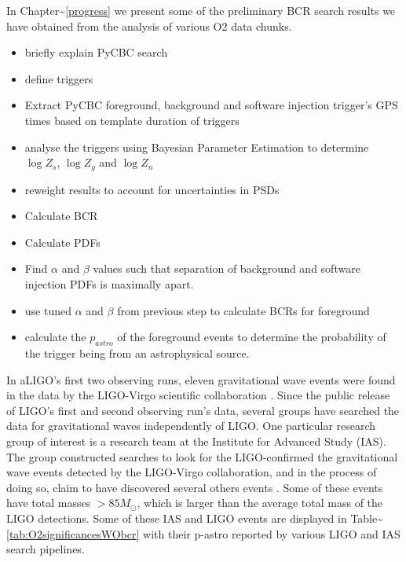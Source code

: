 \documentclass[%
 reprint,
 amsmath,amssymb,
 aps,
]{revtex4}
\begin{document}
In Chapter\textasciitilde\ref{progress} we present some of the preliminary BCR search results we
have obtained from the analysis of various O2 data chunks.






\begin{itemize}
	\item briefly explain PyCBC search
	\item define triggers
	\item Extract PyCBC foreground, background and software injection trigger's GPS times based on template duration of triggers
	\item analyse the triggers using Bayesian Parameter Estimation to determine $\log{Z_s}$, $\log{Z_g}$ and $\log{Z_n}$
	\item reweight results to account for uncertainties in PSDs
	\item Calculate BCR
	\item Calculate PDFs
	\item Find $\alpha$ and $\beta$ values such that separation of background and software injection PDFs is maximally apart.
	\item use tuned $\alpha$ and $\beta$ from previous step to calculate BCRs for foreground
	\item calculate the $p_{astro}$ of the foreground events to determine the probability of the trigger being from an astrophysical source. 
\end{itemize}




In aLIGO's first two observing runs, eleven gravitational wave events were found in the data by the LIGO-Virgo
scientific collaboration \citep{abbott2019gwtc}. Since the public release of LIGO's first and second observing run's data,
several groups have searched the data for gravitational waves independently of LIGO. One particular research group of
interest is a research team at the Institute for Advanced Study (IAS). The group constructed searches to look for the
LIGO-confirmed the gravitational wave events detected by the LIGO-Virgo collaboration, and in the process of doing so,
claim to have discovered several others events \citep{IAS0, IAS1, IAS2}. Some of these events have total masses \(>85 M_{\odot}\), which is larger than the average total mass of the LIGO detections. Some of these IAS and LIGO events are
displayed in Table\textasciitilde\ref{tab:O2significancesWObcr} with their p-astro reported by various LIGO and IAS search pipelines.
\end{document}

